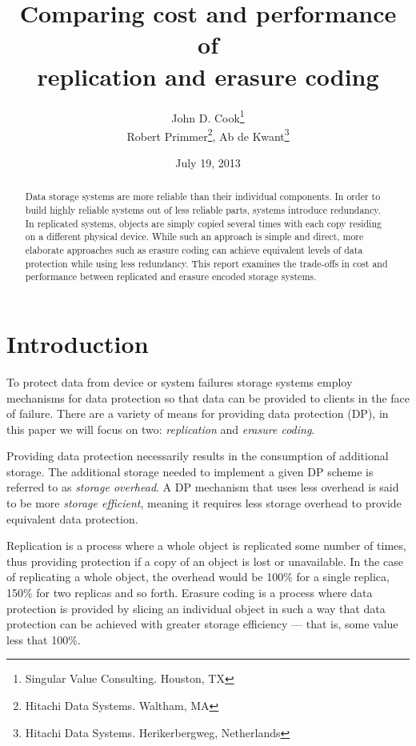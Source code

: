 \documentclass[11pt]{article}
\begin{document}
\title{Comparing cost and performance of \\replication and erasure coding}
\author{John D. Cook\footnote{Singular Value Consulting. Houston, TX} \\
Robert Primmer\footnote{Hitachi Data Systems. Waltham, MA}, Ab de Kwant\footnote{Hitachi Data Systems. Herikerbergweg, Netherlands}}
\date{July 19, 2013}
\maketitle
\parindent=0in
\parskip=0.1in

\begin{abstract}
Data storage systems are more reliable than their individual components. In order to build highly reliable systems out of less reliable parts, systems introduce redundancy. In replicated systems, objects are simply copied several times with each copy residing on a different physical device. While such an approach is simple and direct, more elaborate approaches such as erasure coding can achieve equivalent levels of data protection while using less redundancy. This report examines the trade-offs in cost and performance between replicated and erasure encoded storage systems.
\end{abstract}


\section{Introduction}

To protect data from device or system failures storage systems employ mechanisms for data protection so that data can be provided to clients in the face of failure. There are a variety of means for providing data protection (DP), in this paper we will focus on two: \emph{replication} and \emph{erasure coding}. 

Providing data protection necessarily results in the consumption of additional storage. The additional storage needed to implement a given DP scheme is referred to as \emph{storage overhead}. A DP mechanism that uses less overhead is said to be more \emph{storage efficient}, meaning it requires less storage overhead to provide equivalent data protection. 

Replication is a process where a whole object is replicated some number of times, thus providing protection if a copy of an object is lost or unavailable. In the case of replicating a whole object, the overhead would be 100\% for a single replica, 150\% for two replicas and so forth. Erasure coding is a process where data protection is provided by slicing an individual object in such a way that data protection can be achieved with greater storage efficiency --- that is, some value less that 100\%.  
\end{document}

